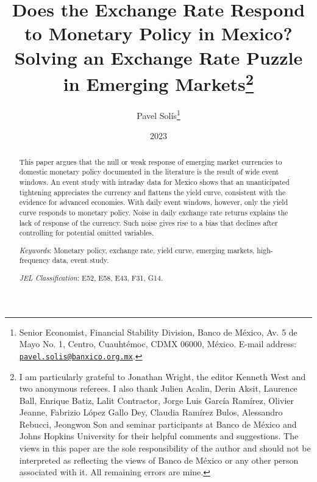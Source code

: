 \documentclass[a4paper,12pt]{article} 		%
\begin{document}
\title{\vspace{-1.0cm} Does the Exchange Rate Respond to Monetary Policy in Mexico? Solving an Exchange Rate Puzzle in Emerging Markets\thanks{\protect\linespread{1}\protect\selectfont I am particularly grateful to Jonathan Wright, the editor Kenneth West and two anonymous referees. I also thank Julien Acalin, Derin Aksit, Laurence Ball, Enrique Batiz, Lalit Contractor, Jorge Luis García Ramírez, Olivier Jeanne, Fabrizio López Gallo Dey, Claudia Ramírez Bulos, Alessandro Rebucci, Jeongwon Son and seminar participants at Banco de México and Johns Hopkins University for their helpful comments and suggestions. The views in this paper are the sole responsibility of the author and should not be interpreted as reflecting the views of Banco de México or any other person associated with it. All remaining errors are mine.} %
	}
\author{Pavel Solís\thanks{\protect\linespread{1}\protect\selectfont Senior Economist, Financial Stability Division, Banco de México, Av. 5 de Mayo No. 1, Centro, Cuauhtémoc, CDMX 06000, México. E-mail address: \href{mailto:pavel.solis@banxico.org.mx}{\texttt{pavel.solis@banxico.org.mx}}.}
}
\date{2023}

\maketitle	\vspace{-4ex}

\begin{abstract}
	This paper argues that the null or weak response of emerging market currencies to domestic monetary policy documented in the literature is the result of wide event windows. An event study with intraday data for Mexico shows that an unanticipated tightening appreciates the currency and flattens the yield curve, consistent with the evidence for advanced economies. With daily event windows, however, only the yield curve responds to monetary policy. Noise in daily exchange rate returns explains the lack of response of the currency. Such noise gives rise to a bias that declines after controlling for potential omitted variables.
	
	\vspace{.5cm}
	
	\noindent \textit{Keywords}: Monetary policy, exchange rate, yield curve, emerging markets, high-frequency data, event study.
	
	\noindent \textit{JEL Classification}: E52, E58, E43, F31, G14. 
	\vfill
	
	\pagebreak
\end{abstract}
\end{document}
